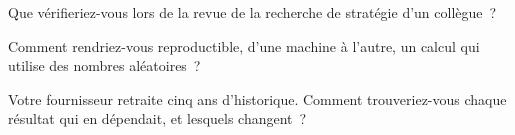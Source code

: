 \begin{interviewq}\label{iq:rs:build-a-research-workflow:4}
Que vérifieriez-vous lors de la revue de la recherche de stratégie d'un collègue~?
\end{interviewq}

\begin{interviewq}\label{iq:rs:build-a-research-workflow:5}
Comment rendriez-vous reproductible, d'une machine à l'autre, un calcul qui utilise des nombres aléatoires~?
\end{interviewq}

\begin{interviewq}\label{iq:rs:build-a-research-workflow:6}
Votre fournisseur retraite cinq ans d'historique. Comment trouveriez-vous chaque résultat qui en dépendait, et lesquels changent~?
\end{interviewq}
